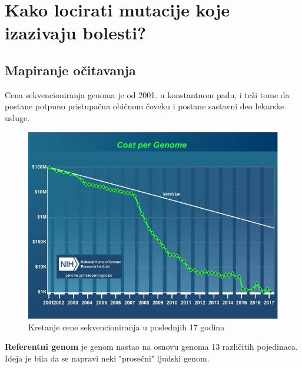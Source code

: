 \chapter {Kako locirati mutacije koje izazivaju bolesti?}
\setbookcodestyle

\section{Mapiranje očitavanja}

\vspace{0.5cm}

Cena sekvencioniranja genoma je od 2001. u konstantnom padu, i teži tome da postane potpuno pristupačna običnom čoveku i postane sastavni deo lekarske usluge.

\begin{figure}[h!]
\centering
\includegraphics[scale=0.7]{poglavlja/9/slike/CostPerGenom.png}
\caption{Kretanje cene sekvencioniranja u poslednjih 17 godina}
\label{slika:X}
\end{figure}

\textbf{Referentni genom} je genom nastao na osnovu genoma 13 različitih pojedinaca. Ideja je bila da se napravi neki "prosečni" ljudski genom.



